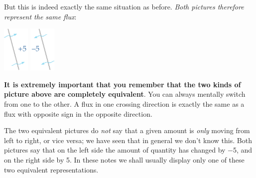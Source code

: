 \documentclass[a4paper,12pt,%
onecolumn,oneside,%
british%
]{memoir}
\renewcommand*{\|}[1][]{\nonscript\:#1\vert\nonscript\:\mathopen{}}
\newcommand*{\sect}{\S}%
\renewcommand*{\autoref}[2]{\sidepar{\vspace{-1ex}\footnotesize{\color{blue}\faIcon{%
angle-right%
}\enspace\sect~\ref{#1} page~\pageref{#1}}}\textcolor{blue}{#2}}
\begin{document}
But this is indeed exactly the same situation as before. \emph{Both pictures therefore represent the same flux}:\noprelistbreak
\begin{center}\label{fig:scalar_fluxes}
  \bigskip
  \hspace*{\fill}
  \includegraphics[align=c,height=6em]{images/flux_plus5c.pdf}
\qquad
\includegraphics[align=c,height=6em]{images/flux_minus5c.pdf}
\hspace*{\fill}
\end{center}

\textbf{It is extremely important that you remember that the two kinds of picture above are completely equivalent}. You can always mentally switch from one to the other. A flux in one crossing direction is exactly the same as a flux with opposite sign in the opposite direction.

The two equivalent pictures do \emph{not} say that a given amount is \emph{only} moving from left to right, or vice versa; we have seen that in general we don't know this. Both pictures say that on the left side the amount of quantity has changed by \num{-5}, and on the right side by \num{+5}. In these notes we shall usually display only one of these two equivalent representations.


\end{document}

